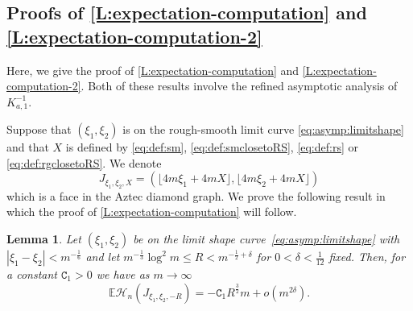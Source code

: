\documentclass[11pt,twoside]{amsart}
\theoremstyle{plain}
\newtheorem{lem}[thm]{Lemma}
\numberwithin{quest}{section}
\theoremstyle{remark}
\numberwithin{rem}{section}
\theoremstyle{definition}
\begin{document}
	
	
	\subsection{Proofs of \cref{L:expectation-computation} and \cref{L:expectation-computation-2}}  \label{S:expectation-computations}
	Here, we give the proof of \cref{L:expectation-computation} and \cref{L:expectation-computation-2}. Both of these results involve the refined asymptotic analysis of $K^{-1}_{a,1}$.  
	
	
	Suppose that  $(\xi_1,\xi_2)$ is on the rough-smooth limit curve \eqref{eq:asymp:limitshape} and that $X$ is defined by \eqref{eq:def:sm}, \eqref{eq:def:smclosetoRS}, \eqref{eq:def:rs} or \eqref{eq:def:rgclosetoRS}. We denote
	\begin{equation*}\label{eq:expectheights:J}
		J_{\xi_1,\xi_2,X}=(\lfloor 4m\xi_1+4mX \rfloor,\lfloor 4m\xi_2+4mX \rfloor)
	\end{equation*}
	which is a face in the Aztec diamond graph.  We prove the following result in which the proof of \cref{L:expectation-computation} will follow.
	
	
	\begin{lem} \label{lem:expectheightroughsmooth}
		Let $(\xi_1,\xi_2)$ be on the limit shape curve~\eqref{eq:asymp:limitshape} with $|\xi_1-\xi_2|<m^{-\frac{1}{6}}$ and let $ m^{-\frac{1}{3}} \log^2 m\leq R < m^{-\frac{1}{2}+\delta}$ for $0< \delta <\frac{1}{12}$ fixed. Then, for a constant $\mathtt{C}_1>0$ we have as $m\to \infty$
		\begin{equation*}
			\mathbb{E}\mathcal{H}_n(J_{\xi_1,\xi_2,-R})=-\mathtt{C}_1 R^{\frac{3}{2}}m +o(m^{2\delta}).
		\end{equation*}
	\end{lem}
	
	
	
\end{document}
